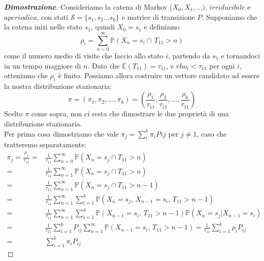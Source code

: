 \documentclass{article}
\theoremstyle{definition}
\theoremstyle{definition}
\theoremstyle{remark}
\begin{document}
\begin{proof}[\textbf{Dimostrazione}]
    Consideriamo la catena di Markov ($X_0,X_1,\dots)$, $irriducibile$ e $aperiodica$, con stati $\mathcal{S} = \{s_1,s_2\dots s_k\}$ e matrice di transizione
    $P$. Supponiamo che la catena inizi nello stato $s_1$, quindi $X_0 = s_1$ e definiamo
    $$\rho_i = \sum_{n = 0}^{\infty}  \mathbb{P}(X_n = s_i \cap \, T_{11}>n)$$
    come il numero medio di visite che faccio allo stato $i$, partendo da $s_1$ e tornandoci in un tempo maggiore di $n$. Dato che $\mathbb{E}(T_{11}) = \tau_{11}$, e $rho_i<\tau_{11}$ per ogni $i$, otteniamo
    che $\rho_i$ è finito. Possiamo allora costruire un vettore candidato ad essere la nostra distribuzione stazionaria:
    $$\pi =(\pi_1,\pi_2,\dots,\pi_k) =  \left(\frac{\rho_1}{\tau_{11}},\frac{\rho_2}{\tau_{11}},\dots,\frac{\rho_k}{\tau_{11}}\right)$$
    Scelto $\pi$ come sopra, non ci resta che dimostrare le due proprietà di una distribuzione stazionaria.\\
    Per prima cosa dimostriamo che vale $\pi_j = \sum_i^k \pi_i Pij$ per $j\neq 1$, caso che tratteremo separatamente:
    \begin{align*}
        \pi_j = \frac{\rho_j}{\tau_{11}} = & \frac{1}{\tau_{11}}\sum_{n = 0}^{\infty}\mathbb{P}(X_n = s_j \cap T_{11}>n)                                                                      \\
        =                                  & \frac{1}{\tau_{11}}\sum_{n = 1}^{\infty}\mathbb{P}(X_n = s_j \cap T_{11}>n)                                                                      \\
        =                                  & \frac{1}{\tau_{11}}\sum_{n = 1}^{\infty}\mathbb{P}(X_n = s_j \cap T_{11}>n-1)                                                                    \\
        =                                  & \frac{1}{\tau_{11}}\sum_{n = 1}^{\infty}\sum_{i=1}^k\mathbb{P}(X_n = s_j,\, X_{n-1} = s_i,\,T_{11}>n-1)                                          \\
        =                                  & \frac{1}{\tau_{11}}\sum_{n = 1}^{\infty}\sum_{i=1}^k\mathbb{P}( X_{n-1} = s_i,\,T_{11}>n-1)\mathbb{P}(X_n = s_j|X_{n-1} = s_i)                   \\
        =                                  & \frac{1}{\tau_{11}}\sum_{i=1}^kP_{ij}\sum_{n = 1}^{\infty}\mathbb{P}( X_{n-1} = s_i,\,T_{11}>n-1) =  \frac{1}{\tau_{11}}\sum_{i=1}^k\rho_iP_{ij} \\
        =                                  & \sum_{i=1}^k\pi_iP_{ij}

\end{align*}
\end{proof}
\end{document}
